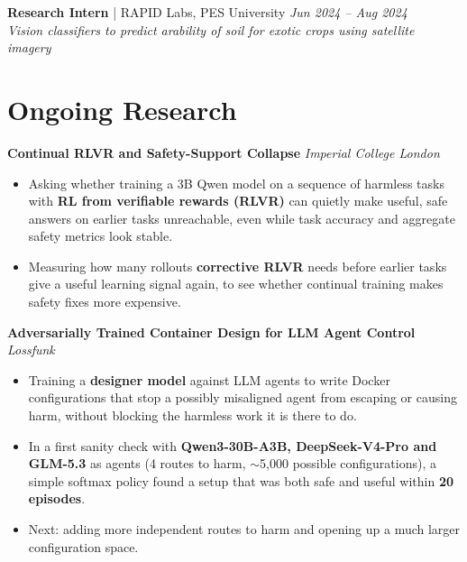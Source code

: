\documentclass[10pt,a4paper]{article}
\newcommand{\entrygap}{\vspace{5pt}\needspace{4\baselineskip}}
\begin{document}
\textbf{Research Intern} | RAPID Labs, PES University \hfill \textit{Jun 2024 -- Aug 2024} \\
\textit{Vision classifiers to predict arability of soil for exotic crops using satellite imagery}

\section{Ongoing Research}

\textbf{Continual RLVR and Safety-Support Collapse}  \hfill \textit{Imperial College London}
\begin{itemize}
  \item Asking whether training a 3B Qwen model on a sequence of harmless tasks with \textbf{RL from verifiable rewards (RLVR)} can quietly make useful, safe answers on earlier tasks unreachable, even while task accuracy and aggregate safety metrics look stable.
  \item Measuring how many rollouts \textbf{corrective RLVR} needs before earlier tasks give a useful learning signal again, to see whether continual training makes safety fixes more expensive.
\end{itemize}
\entrygap

\textbf{Adversarially Trained Container Design for LLM Agent Control}  \hfill \textit{Lossfunk}
\begin{itemize}
  \item Training a \textbf{designer model} against LLM agents to write Docker configurations that stop a possibly misaligned agent from escaping or causing harm, without blocking the harmless work it is there to do.
  \item In a first sanity check with \textbf{Qwen3-30B-A3B, DeepSeek-V4-Pro and GLM-5.3} as agents (4 routes to harm, $\sim$5,000 possible configurations), a simple softmax policy found a setup that was both safe and useful within \textbf{20 episodes}.
  \item Next: adding more independent routes to harm and opening up a much larger configuration space.
\end{itemize}
\entrygap
\end{document}
